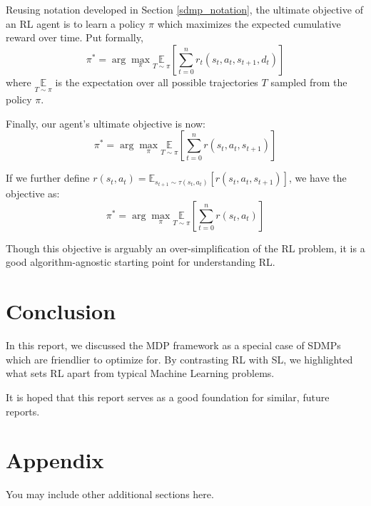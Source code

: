 \documentclass{article} %
\begin{document}
Reusing notation developed in Section \ref{sdmp_notation}, the ultimate objective of an RL agent is to learn a policy $\pi$ which maximizes the expected cumulative reward over time. Put formally,
\begin{equation} \label{sdmp_obj}
      \pi^* = \arg\max_\pi \underset{T \sim \pi}{\mathbb{E}} \left[ \sum_{t=0}^{n} r_t(s_t, a_t, s_{t+1}, d_t) \right]
\end{equation}
where $\underset{T \sim \pi}{\mathbb{E}}$ is the expectation over all possible trajectories $T$ sampled from the policy $\pi$.

Finally, our agent's ultimate objective is now:
\begin{equation} \label{mdp_obj}
    \pi^* = \arg\max_\pi \underset{T \sim \pi}{\mathbb{E}} \left[ \sum_{t=0}^{n} r(s_t, a_t, s_{t + 1}) \right]
\end{equation}

If we further define $r(s_t, a_t) = \mathbb{E}_{s_{t + 1} \sim \tau(s_t, a_t)}[r(s_t, a_t, s_{t + 1})]$, 
we have the objective as:
\begin{equation} \label{mdp_obj_concise}
   \pi^* = \arg\max_\pi \underset{T \sim \pi}{\mathbb{E}} \left[ \sum_{t=0}^{n} r(s_t, a_t) \right]
\end{equation}

Though this objective is arguably an over-simplification of the RL problem,
it is a good algorithm-agnostic starting point for understanding RL.

\section{Conclusion}

In this report, we discussed the MDP framework as a special case of SDMPs which are friendlier to optimize for.
By contrasting RL with SL, we highlighted what sets RL apart from typical Machine Learning problems.

It is hoped that this report serves as a good foundation for similar, future reports.




\appendix
\section{Appendix}
You may include other additional sections here.
\end{document}
